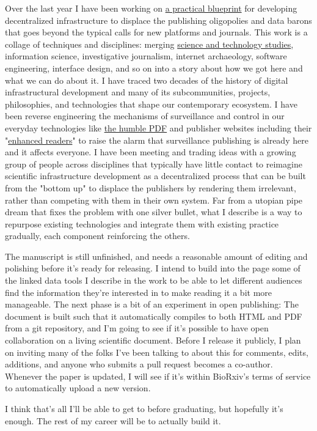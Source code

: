 \begin{done}
Over the last year I have been working on \href{https://jon-e.net/infrastructure/}{a practical blueprint} for developing decentralized infrastructure to displace the publishing oligopolies and data barons that goes beyond the typical calls for new platforms and journals. This work is a collage of techniques and disciplines: merging \href{https://en.wikipedia.org/wiki/Science_and_technology_studies}{science and technology studies}, information science, investigative journalism, internet archaeology, software engineering, interface design, and so on into a story about how we got here and what we can do about it. I have traced two decades of the history of digital infrastructural development and many of its subcommunities, projects, philosophies, and technologies that shape our contemporary ecosystem. I have been reverse engineering the mechanisms of surveillance and control in our everyday technologies like \href{https://twitter.com/json_dirs/status/1486120144141123584}{the humble PDF}\cite{franceschi-bicchieraiAcademicJournalClaims2022} and publisher websites including their "\href{https://twitter.com/json_dirs/status/1466951017459716096}{enhanced readers}"\cite{deferCommentEditeursScientifiques2022} to raise the alarm that surveillance publishing is already here and it affects everyone. I have been meeting and trading ideas with a growing group of people across disciplines that typically have little contact to reimagine scientific infrastructure development as a decentralized process that can be built from the "bottom up" to displace the publishers by rendering them irrelevant, rather than competing with them in their own system. Far from a utopian pipe dream that fixes the problem with one silver bullet, what I describe is a way to repurpose existing technologies and integrate them with existing practice gradually, each component reinforcing the others. 
\end{done}

\begin{todo}
The manuscript is still unfinished, and needs a reasonable amount of editing and polishing before it's ready for releasing. I intend to build into the page some of the linked data tools I describe in the work to be able to let different audiences find the information they're interested in to make reading it a bit more manageable. The next phase is a bit of an experiment in open publishing: The document is built such that it automatically compiles to both HTML and PDF from a git repository, and I'm going to see if it's possible to have open collaboration on a living scientific document. Before I release it publicly, I plan on inviting many of the folks I've been talking to about this for comments, edits, additions, and anyone who submits a pull request becomes a co-author. Whenever the paper is updated, I will see if it's within BioRxiv's terms of service to automatically upload a new version.
\end{todo}

I think that's all I'll be able to get to before graduating, but hopefully it's enough. The rest of my career will be to actually build it.
